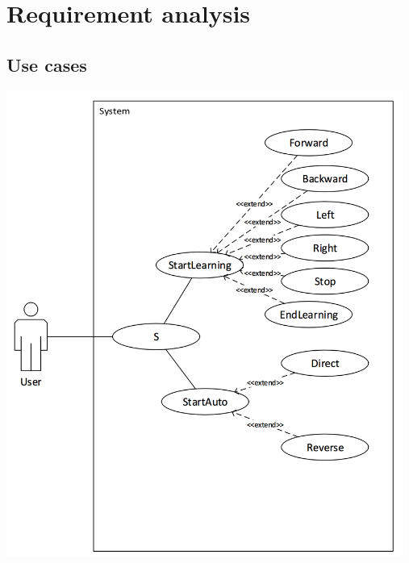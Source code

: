 \documentclass{llncs}
\newcommand{\labelsec}[1]{\label{sec:#1}}
\newcommand{\labelssec}[1]{\label{ssec:#1}}
\begin{document}

 
\section{Requirement analysis}
\labelsec{ReqAnalysis}
\subsection{Use cases}
\includegraphics[width=13cm]{img/usecase.png}\\
\labelssec{UseCases}
\end{document}
